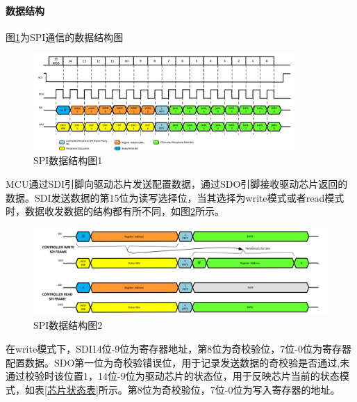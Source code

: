     \paragraph{数据结构}
    图\ref{SPI数据结构图1}为SPI通信的数据结构图
    \begin{figure}[ht]
        \centering
        \includegraphics[width=10cm]{figure/SPI Frame.png}
        \caption{SPI数据结构图1}
        \label{SPI数据结构图1}
    \end{figure}
    MCU通过SDI引脚向驱动芯片发送配置数据，通过SDO引脚接收驱动芯片返回的数据。SDI发送数据的第15位为读写选择位，当其选择为write模式或者read模式时，数据收发数据的结构都有所不同，如图\ref{SPI数据结构图2}所示。
    \begin{figure}[ht]
        \centering
        \includegraphics[width=12cm]{figure/SPI Transfer Sequence.png}
        \caption{SPI数据结构图2}
        \label{SPI数据结构图2}
    \end{figure}
    在write模式下，SDI14位-9位为寄存器地址，第8位为奇校验位，7位-0位为寄存器配置数据。SDO第一位为奇校验错误位，用于记录发送数据的奇校验是否通过,未通过校验时该位置1，14位-9位为驱动芯片的状态位，用于反映芯片当前的状态模式，如表\ref{芯片状态表}所示。第8位为奇校验位，7位-0位为写入寄存器的地址。\par
    
